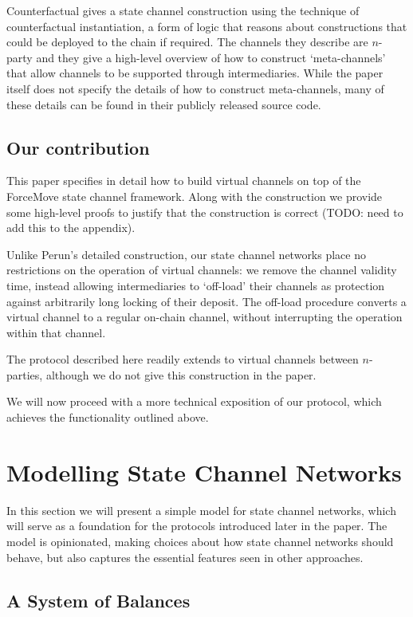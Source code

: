 \documentclass{article}
\begin{document}
Counterfactual gives a state channel construction using the technique of counterfactual instantiation, a form of logic that reasons about constructions that could be deployed to the chain if required.
The channels they describe are $n$-party and they give a high-level overview of how to construct `meta-channels' that allow channels to be supported through intermediaries.
While the paper itself does not specify the details of how to construct meta-channels, many of these details can be found in their publicly released source code.

\subsection{Our contribution}

This paper specifies in detail how to build virtual channels on top of the ForceMove state channel framework.
Along with the construction we provide some high-level proofs to justify that the construction is correct (TODO: need to add this to the appendix).

Unlike Perun's detailed construction, our state channel networks place no restrictions on the operation of virtual channels:
we remove the channel validity time, instead allowing intermediaries to `off-load' their channels as protection against arbitrarily long locking of their deposit.
The off-load procedure converts a virtual channel to a regular on-chain channel, without interrupting the operation within that channel.

The protocol described here readily extends to virtual channels between $n$-parties, although we do not give this construction in the paper.

We will now proceed with a more technical exposition of our protocol, which achieves the functionality outlined above.

\section{Modelling State Channel Networks}

In this section we will present a simple model for state channel networks, which will serve as a foundation
for the protocols introduced later in the paper.
The model is opinionated, making choices about how state channel networks should behave, but also captures the essential features seen in other approaches.

\subsection{A System of Balances}
\end{document}

